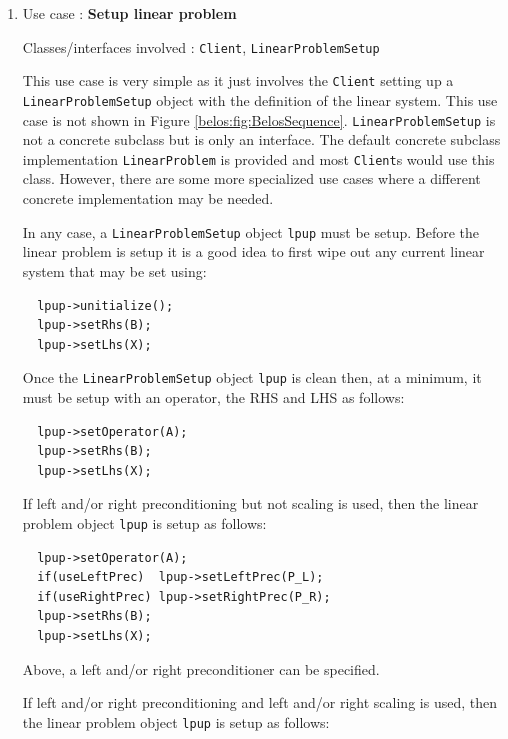 \documentclass[pdf,ps2pdf,11pt]{SANDreport}
\begin{document}
\begin{enumerate}

\item Use case : \textbf{Setup linear problem}

{}\noindent{}Classes/interfaces involved : {}\texttt{Client},
{}\texttt{Linear\-Problem\-Setup}

This use case is very simple as it just involves the {}\texttt{Client}
setting up a {}\texttt{Linear\-Problem\-Setup} object with the
definition of the linear system.  This use case is not shown in Figure
{}\ref{belos:fig:BelosSequence}.  {}\texttt{Linear\-Problem\-Setup} is
not a concrete subclass but is only an interface.  The default
concrete subclass implementation {}\texttt{Linear\-Problem} is
provided and most {}\texttt{Client}s would use this class.  However,
there are some more specialized use cases where a different concrete
implementation may be needed.

In any case, a {}\texttt{Linear\-Problem\-Setup} object
{}\texttt{lpup} must be setup.  Before the linear problem is setup
it is a good idea to first wipe out any current linear system that
may be set using:

{\scriptsize\begin{verbatim}
  lpup->unitialize();
  lpup->setRhs(B);
  lpup->setLhs(X);
\end{verbatim}}

Once the {}\texttt{Linear\-Problem\-Setup} object {}\texttt{lpup} is
clean then, at a minimum, it must be setup with an operator, the RHS
and LHS as follows:

{\scriptsize\begin{verbatim}
  lpup->setOperator(A);
  lpup->setRhs(B);
  lpup->setLhs(X);
\end{verbatim}}

If left and/or right preconditioning but not scaling is used, then the
linear problem object {}\texttt{lpup} is setup as follows:

{\scriptsize\begin{verbatim}
  lpup->setOperator(A);
  if(useLeftPrec)  lpup->setLeftPrec(P_L);
  if(useRightPrec) lpup->setRightPrec(P_R);
  lpup->setRhs(B);
  lpup->setLhs(X);
\end{verbatim}}

Above, a left and/or right preconditioner can be specified.

If left and/or right preconditioning and left and/or right scaling is
used, then the linear problem object {}\texttt{lpup} is setup as
follows:


\end{enumerate}
\end{document}
